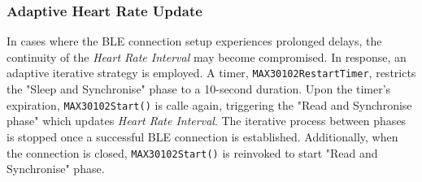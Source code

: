 \subsubsection{Adaptive Heart Rate Update}
In cases where the BLE connection setup experiences prolonged delays, the continuity of the \textit{Heart Rate Interval} may become compromised. In response, an adaptive iterative strategy is employed. A timer, \texttt{MAX30102RestartTimer}, restricts the "Sleep and Synchronise" phase to a 10-second duration. Upon the timer's expiration, \texttt{MAX30102Start()} is calle again, triggering the "Read and Synchronise phase" which updates \textit{Heart Rate Interval}. The iterative process between phases is stopped once a successful BLE connection is established. Additionally, when the connection is closed, \texttt{MAX30102Start()} is reinvoked to start "Read and Synchronise" phase. 
